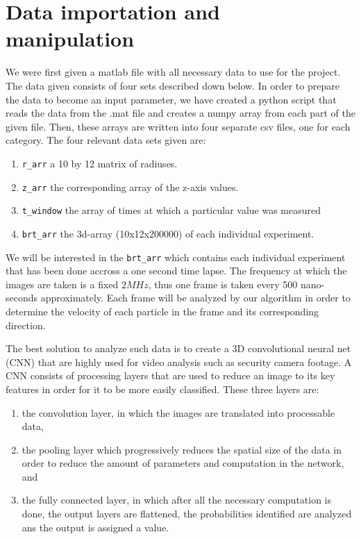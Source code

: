 \documentclass[10pt,conference,compsocconf]{IEEEtran}
\begin{document}
\section{Data importation and manipulation}
We were first given a matlab file with all necessary data to use for the project. The data given consists of four sets described down below. In order to prepare the data to become an input parameter, we have created a python script that reads the data from the .mat file and creates a numpy array from each part of the given file. Then, these arrays are written into four separate csv files, one for each category. The four relevant data sets given are:
\begin{enumerate}
  \item \texttt{r\_arr} a 10 by 12 matrix of radiuses.
  \item \texttt{z\_arr} the corresponding array of the z-axis values.
  \item \texttt{t\_window} the array of times at which a particular value was measured
  \item \texttt{brt\_arr} the 3d-array (10x12x200000) of each individual experiment.
\end{enumerate}
We will be interested in the \texttt{brt\_arr} which contains each individual experiment that has been done accross a one second time lapse. The frequency at which the images are taken is a fixed $2MHz$, thus one frame is taken every 500 nano-seconds approximately. Each frame will be analyzed by our algorithm in order to determine the velocity of each particle in the frame and its corresponding direction.\par
The best solution to analyze such data is to create a 3D convolutional neural net (CNN) that are highly used for video analysis such as security camera footage. A CNN consists of processing layers that are used to reduce an image to its key features in order for it to be more easily classified. These three layers are:
\begin{enumerate}
  \item the convolution layer, in which the images are translated into processable data,
  \item the pooling layer which progressively reduces the spatial size of the data in order to reduce the amount of parameters and computation in the network, and
  \item the fully connected layer, in which after all the necessary computation is done, the output layers are flattened, the probabilities identified are analyzed ans the output is assigned a value.
\end{enumerate}
\end{document}
